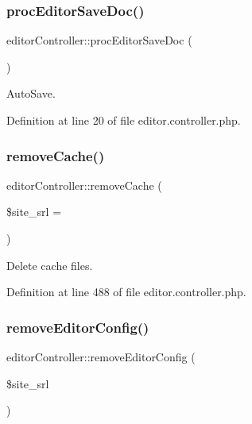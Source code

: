 \subsubsection{\texorpdfstring{proc\+Editor\+Save\+Doc()}{procEditorSaveDoc()}}
{\footnotesize\ttfamily editor\+Controller\+::proc\+Editor\+Save\+Doc (\begin{DoxyParamCaption}{ }\end{DoxyParamCaption})}



Auto\+Save. 



Definition at line 20 of file editor.\+controller.\+php.

\hypertarget{classeditorController_a0a512fff61d647692ad254eacafb8f0b}{}\label{classeditorController_a0a512fff61d647692ad254eacafb8f0b} 
\subsubsection{\texorpdfstring{remove\+Cache()}{removeCache()}}
{\footnotesize\ttfamily editor\+Controller\+::remove\+Cache (\begin{DoxyParamCaption}\item[{}]{\$site\+\_\+srl = {} }\end{DoxyParamCaption})}



Delete cache files. 



Definition at line 488 of file editor.\+controller.\+php.

\hypertarget{classeditorController_a0c27d19482d9ad6c9de0e42ad7ad6465}{}\label{classeditorController_a0c27d19482d9ad6c9de0e42ad7ad6465} 
\subsubsection{\texorpdfstring{remove\+Editor\+Config()}{removeEditorConfig()}}
{\footnotesize\ttfamily editor\+Controller\+::remove\+Editor\+Config (\begin{DoxyParamCaption}\item[{}]{\$site\+\_\+srl }\end{DoxyParamCaption})}



